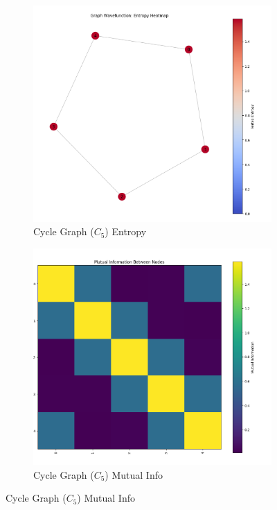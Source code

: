 \documentclass[12pt, letterpaper]{article}
\begin{document}
\begin{figure}[h!]
    \centering
    \begin{subfigure}[b]{0.48\textwidth}
        \includegraphics[width=\textwidth]{images/Cycle_Graph_Entropy_Map.png}
        \caption{Cycle Graph ($C_5$) Entropy}
        \label{fig:cycle_entropy}
    \end{subfigure}
    \hfill
    \begin{subfigure}[b]{0.48\textwidth}
        \includegraphics[width=\textwidth]{images/Cycle_Graph_Mutal_Info_Matrix.png}
        \caption{Cycle Graph ($C_5$) Mutual Info}
        \label{fig:cycle_mi}
    \end{subfigure}
    

\end{figure}
\end{document}
